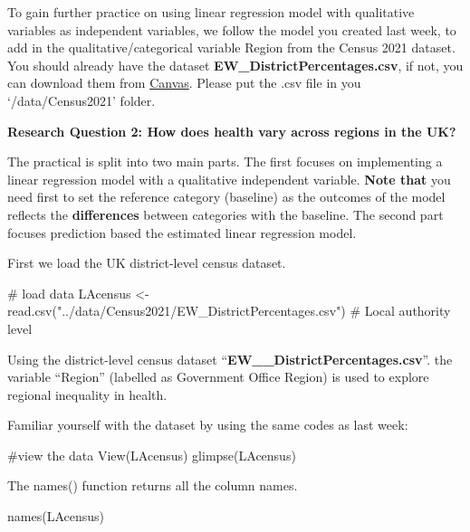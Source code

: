\documentclass[
  letterpaper,
  DIV=11,
  numbers=noendperiod]{scrreprt}
\newenvironment{Shaded}{\begin{snugshade}}{\end{snugshade}}
\newcommand{\CommentTok}[1]{\textcolor[rgb]{0.37,0.37,0.37}{#1}}
\newcommand{\FunctionTok}[1]{\textcolor[rgb]{0.28,0.35,0.67}{#1}}
\newcommand{\NormalTok}[1]{\textcolor[rgb]{0.00,0.23,0.31}{#1}}
\newcommand{\OtherTok}[1]{\textcolor[rgb]{0.00,0.23,0.31}{#1}}
\newcommand{\StringTok}[1]{\textcolor[rgb]{0.13,0.47,0.30}{#1}}
\begin{document}
To gain further practice on using linear regression model with
qualitative variables as independent variables, we follow the model you
created last week, to add in the qualitative/categorical variable Region
from the Census 2021 dataset. You should already have the dataset
\textbf{EW\_DistrictPercentages.csv}, if not, you can download them from
\href{https://canvas.liverpool.ac.uk/courses/84668/pages/census-data?module_item_id=2396199}{Canvas}.
Please put the .csv file in you `/data/Census2021' folder.

\textbf{Research Question 2: How does health vary across regions in the
UK?}

The practical is split into two main parts. The first focuses on
implementing a linear regression model with a qualitative independent
variable. \textbf{Note that} you need first to set the reference
category (baseline) as the outcomes of the model reflects the
\textbf{differences} between categories with the baseline. The second
part focuses prediction based the estimated linear regression model.

First we load the UK district-level census dataset.

\begin{Shaded}
\begin{Highlighting}[]
\CommentTok{\# load data}
\NormalTok{LAcensus }\OtherTok{\textless{}{-}} \FunctionTok{read.csv}\NormalTok{(}\StringTok{"../data/Census2021/EW\_DistrictPercentages.csv"}\NormalTok{) }\CommentTok{\# Local authority level}
\end{Highlighting}
\end{Shaded}

Using the district-level census dataset
``\textbf{EW\_\_DistrictPercentages.csv}''. the variable ``Region''
(labelled as Government Office Region) is used to explore regional
inequality in health.

Familiar yourself with the dataset by using the same codes as last week:

\begin{Shaded}
\begin{Highlighting}[]
\CommentTok{\#view the data }
\FunctionTok{View}\NormalTok{(LAcensus)  }
\FunctionTok{glimpse}\NormalTok{(LAcensus)}
\end{Highlighting}
\end{Shaded}

The names() function returns all the column names.

\begin{Shaded}
\begin{Highlighting}[]
\FunctionTok{names}\NormalTok{(LAcensus)}
\end{Highlighting}
\end{Shaded}
\end{document}
